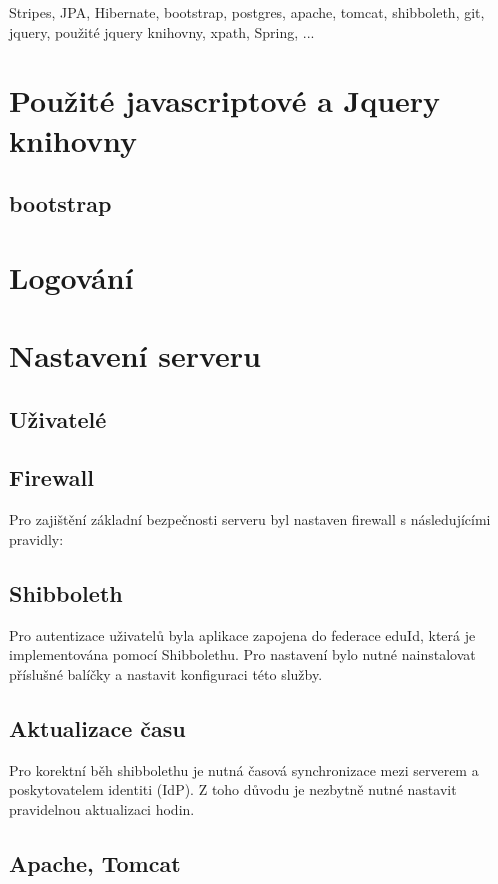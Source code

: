 Stripes, JPA, Hibernate, bootstrap, postgres, apache, tomcat, shibboleth, 
git, jquery, použité jquery knihovny, xpath, Spring, ... 

\section{Použité javascriptové a Jquery knihovny}
\subsection{bootstrap}

\section{Logování}

\section{Nastavení serveru}

\subsection{Uživatelé}

\subsection{Firewall}
Pro zajištění základní bezpečnosti serveru byl nastaven firewall s následujícími pravidly:

\subsection{Shibboleth}
Pro autentizace uživatelů byla aplikace zapojena do federace eduId, která je implementována pomocí Shibbolethu. Pro nastavení bylo nutné nainstalovat příslušné balíčky a nastavit konfiguraci této služby.

\subsection{Aktualizace času}
Pro korektní běh shibbolethu je nutná časová synchronizace mezi serverem a poskytovatelem identiti (IdP). Z toho důvodu je nezbytně nutné nastavit pravidelnou aktualizaci hodin. 
\subsection{Apache, Tomcat}

